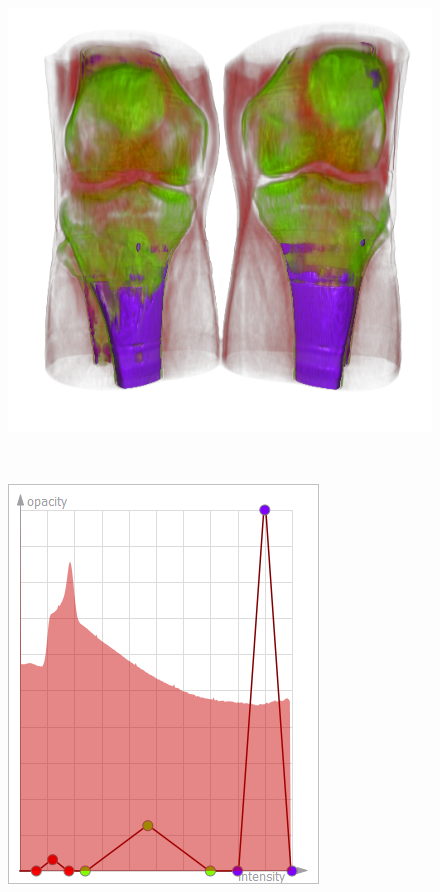 \begin{figure}
\begin{minipage}{.2\textwidth}
		\subcaption{}
	\end{minipage}~
	\begin{minipage}{.29\textwidth}
		\includegraphics[width=1\linewidth]{images/CT-Knee_naive_optimized_linesearch}
		\subcaption{}
	\end{minipage}~
	\begin{minipage}{.2\textwidth}
		\includegraphics[width=1\linewidth]{figures/tf_CT-Knee_naive_optimized_linesearch}
		\subcaption{}
	\end{minipage}
		

\end{figure}
